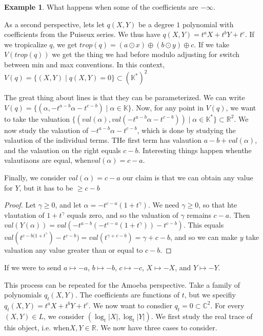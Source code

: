 \documentclass[12pt]{memoir}
\theoremstyle{definition}
\newtheorem{protoexample}{Example}[section]
\newenvironment{ex}
   {\begin{protoexample}}
   {\end{protoexample}}
\def\RR{{\mathbb R}}
\def\KK{{\mathbb K}}
\def\CC{{\mathbb C}}
\begin{document}
\begin{ex}
    What happens when some of the coefficients are $-\infty$.
\end{ex}



As a second perspective, lets let $q(X,Y)$ be a degree $1$ polynomial with coefficients from the Puiseux  series. We thus have $q(X,Y)=t^aX+t^bY+t^c$. If we tropicalize $q$, we get $trop(q)=(a \odot x) \oplus (b \odot y) \oplus c$. If we take $V(trop (q))$ we get the thing we had before modulo adjusting for switch between min and max conventions. In this context, $V(q) = \{(X,Y)\; |\; q(X,Y)=0\} \subset (\KK^*)^2$


The great thing about lines is that they can be parameterized. We can write $V(q)= \{(\alpha, -t^{a-b}\alpha -t^{c-b})\; |\; \alpha \in \KK\}$. Now, for any point in $V(q)$, we want to take the valuation $\{(val(\alpha),val( -t^{a-b}\alpha -t^{c-b}))\; |\; \alpha \in \KK^*\} \subset \RR^2$. We now study the valaution of $-t^{a-b}\alpha -t^{c-b}$, which is done by studying the valaution of the individual terms. THe first term has valaution $a-b + val(\alpha)$, and the valaution on the right equals $c-b$. Interesting things happen whenthe valautiaons are equal, when$ val(\alpha)= c-a$.


Finally, we consider $val(\alpha) = c-a$ our claim is that we can obtain any value for $Y$, but it has to be $\geq c-b$

\begin{proof}
    Let $\gamma \geq 0$, and let $\alpha =-t^{c-a}(1+t^\gamma)$. We need $\gamma \geq 0$, so that hte vlautation of $1+t^{\gamma}$ equals zero, and so the valuation of $\gamma$ remains $c-a$. Then $val(Y(\alpha)) =val(-t^{a-b}(-t^{c-a}(1+t^\gamma)) - t^{c-b} )$. This equals $val(t^{c-b(1+t^\gamma}) -t^{c-b}) = val(t^{\gamma +c-b}) = \gamma+c-b$, and so we can make $y$ take valuation any value greater than or equal to $c-b$.
\end{proof}


If we were to send $a \mapsto -a$, $b \mapsto -b$, $c \mapsto -c$, $X \mapsto -X$, and $Y \mapsto -Y$.


This process can be repeated for the Amoeba perspective. Take a family of polynomials $q_t(X,Y)$. The coefficients are functions of $t$, but we specifiy $q_t(X,Y) = t^aX + t^bY+t^c$. We now want to consdier $q_t = 0 \subset \CC^2$. For every $(X,Y) \in L$, we consider $(\log_t|X|,\log_t|Y|)$. We first study the real trace of this object, i.e. when$ X,Y \in \RR$. We now have three cases to consider. 
\end{document}
